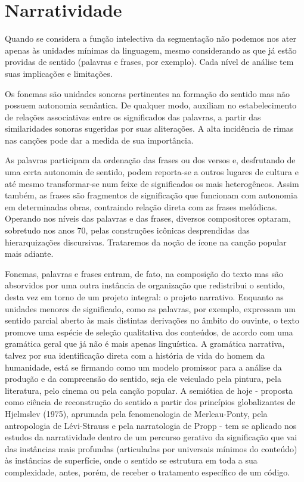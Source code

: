\section{Narratividade}

Quando se considera a função intelectiva da segmentação não podemos nos
ater apenas às unidades mínimas da linguagem, mesmo considerando as que
já estão providas de sentido (palavras e frases, por exemplo). Cada
nível de análise tem suas implicações e limitações.

Os fonemas são unidades sonoras pertinentes na formação do sentido mas
não possuem autonomia semântica. De qualquer modo, auxiliam no
estabelecimento de relações associativas entre os significados das
palavras, a partir das similaridades sonoras sugeridas por suas
aliterações. A alta incidência de rimas nas canções pode dar a medida de
sua importância.~

As palavras participam da ordenação das frases ou dos versos e,
desfrutando de uma certa autonomia de sentido, podem reporta-se a outros
lugares de cultura e até mesmo transformar-se num feixe de significados
os mais heterogêneos. Assim também, as frases são fragmentos de
significação que funcionam com autonomia em determinadas obras,
contraindo relação direta com as frases melódicas. Operando nos níveis
das palavras e das frases, diversos compositores optaram, sobretudo nos
anos 70, pelas construções icônicas desprendidas das hierarquizações
discursivas. Trataremos da noção de ícone na canção popular mais
adiante.~

Fonemas, palavras e frases entram, de fato, na composição do texto mas
são absorvidos por uma outra instância de organização que redistribui o
sentido, desta vez em torno de um projeto integral: o projeto narrativo.
Enquanto as unidades menores de significado, como as palavras, por
exemplo, expressam um sentido parcial aberto às mais distintas
derivações no âmbito do ouvinte, o texto promove uma espécie de seleção
qualitativa dos conteúdos, de acordo com uma gramática geral que já não
é mais apenas linguística. A gramática narrativa, talvez por sua
identificação direta com a história de vida do homem da humanidade, está
se firmando como um modelo promissor para a análise da produção e da
compreensão do sentido, seja ele veiculado pela pintura, pela
literatura, pelo cinema ou pela canção popular. A semiótica de hoje -
proposta como ciência de reconstrução do sentido a partir dos princípios
globalizantes de Hjelmslev (1975), aprumada pela fenomenologia de
Merleau-Ponty, pela antropologia de Lévi-Strauss e pela narratologia de
Propp - tem se aplicado nos estudos da narratividade dentro de um
percurso gerativo da significação que vai das instâncias mais profundas
(articuladas por universais mínimos do conteúdo) às instâncias de
superfície, onde o sentido se estrutura em toda a sua complexidade,
antes, porém, de receber o tratamento específico de um código.

